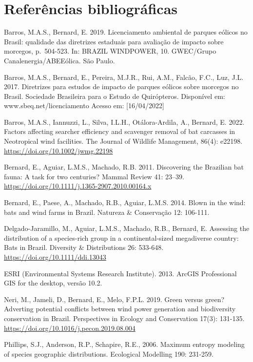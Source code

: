 \documentclass[
  oneside]{scrbook}
\begin{document}
\newpage

\hypertarget{referuxeancias-bibliogruxe1ficas-8}{%
\section{Referências bibliográficas}\label{referuxeancias-bibliogruxe1ficas-8}}

Barros, M.A.S., Bernard, E. 2019. Licenciamento ambiental de parques eólicos no Brasil: qualidade das diretrizes estaduais para avaliação de impacto sobre morcegos, p.~504-523. In: BRAZIL WINDPOWER, 10. GWEC/Grupo Canalenergia/ABEEólica. São Paulo.

Barros, M.A.S., Bernard, E., Pereira, M.J.R., Rui, A.M., Falcão, F.C., Luz, J.L. 2017. Diretrizes para estudos de impacto de parques eólicos sobre morcegos no Brasil. Sociedade Brasileira para o Estudo de Quirópteros. Disponível em: www.sbeq.net/licenciamento Acesso em: {[}16/04/2022{]}

Barros, M.A.S., Iannuzzi, L., Silva, I.L.H., Otálora-Ardila, A., Bernard, E. 2022. Factors affecting searcher efficiency and scavenger removal of bat carcasses in Neotropical wind facilities. The Journal of Wildlife Management, 86(4): e22198. \url{https://doi.org/10.1002/jwmg.22198}

Bernard, E., Aguiar, L.M.S., Machado, R.B. 2011. Discovering the Brazilian bat fauna: A task for two centuries? Mammal Review 41: 23--39. \url{https://doi.org/10.1111/j.1365-2907.2010.00164.x}

Bernard, E., Paese, A., Machado, R.B., Aguiar, L.M.S. 2014. Blown in the wind: bats and wind farms in Brazil. Natureza \& Conservação 12: 106-111.

Delgado-Jaramillo, M., Aguiar, L.M.S., Machado, R.B., Bernard, E. Assessing the distribution of a species-rich group in a continental-sized megadiverse country: Bats in Brazil. Diversity \& Distributions 26: 533-648. \url{https://doi.org/10.1111/ddi.13043}

ESRI (Environmental Systems Research Institute). 2013. ArcGIS Professional GIS for the desktop, versão 10.2.

Neri, M., Jameli, D., Bernard, E., Melo, F.P.L. 2019. Green versus green? Adverting potential conflicts between wind power generation and biodiversity conservation in Brazil. Perspectives in Ecology and Conservation 17(3): 131-135. \url{https://doi.org/10.1016/j.pecon.2019.08.004}

Phillips, S.J., Anderson, R.P., Schapire, R.E., 2006. Maximum entropy modeling of species geographic distributions. Ecological Modelling 190: 231-259.
\end{document}
